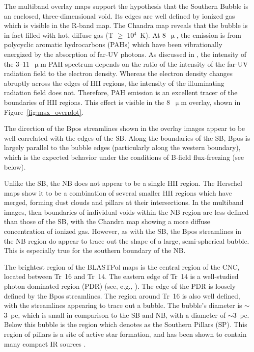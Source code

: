 The multiband overlay maps support the hypothesis that the Southern Bubble is an enclosed, three-dimensional void. Its edges are well defined by ionized gas which is visible in the R-band map. The Chandra map reveals that the bubble is in fact filled with hot, diffuse gas (T $\geq$ 10$^{4}$~K). At 8~$\upmu$, the emission is from polycyclic aromatic hydrocarbons (PAHs) which have been vibrationally energized by the absorption of far-UV photons. As discussed in \citet{li2006results}, the intensity of the 3--11~$\upmu$m PAH spectrum depends on the ratio of the intensity of the far-UV radiation field to the electron density. Whereas the electron density changes abruptly across the edges of HII regions, the intensity of the illuminating radiation field does not. Therefore, PAH emission is an excellent tracer of the boundaries of HII regions. This effect is visible in the 8~$\upmu$m overlay, shown in Figure~\ref{fig:msx_overplot}.

The direction of the \gls{Bpos} streamlines shown in the overlay images appear to be well correlated with the edges of the SB. Along the boundaries of the SB, \gls{Bpos} is largely parallel to the bubble edges (particularly along the western boundary), which is the expected behavior under the conditions of B-field flux-freezing \citep{li2006results} (see below).

Unlike the SB, the NB does not appear to be a single HII region. The Herschel maps show it to be a combination of several smaller HII regions which have merged, forming dust clouds and pillars at their intersections. In the multiband images, then boundaries of individual voids within the NB region are less defined than those of the SB, with the Chandra map showing a more diffuse concentration of ionized gas. However, as with the SB, the \gls{Bpos} streamlines in the NB region do appear to trace out the shape of a large, semi-spherical bubble. This is especially true for the southern boundary of the NB.

The brightest region of the BLASTPol maps is the central region of the CNC, located between Tr~16 and Tr~14. The eastern edge of Tr~14 is a well-studied photon dominated region (PDR) (see, e.g., \citet{kramer2008clumpy}). The edge of the PDR is loosely defined by the \gls{Bpos} streamlines. The region around Tr~16 is also well defined, with the streamlines appearing to trace out a bubble. The bubble's diameter is $\sim$3~pc, which is small in comparison to the SB and NB, with a diameter of $\sim$3~pc. Below this bubble is the region which \citet{preibisch2012herschel} denotes as the Southern Pillars (SP). This region of pillars is a site of active star formation, and has been shown to contain many compact IR sources \citep{smith2010spitzer}.

